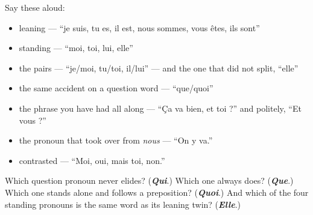 Say these aloud:

\begin{itemize}
\raggedright
  \item leaning — \textquotedblleft{}je suis, tu es, il est, nous sommes, vous êtes, ils sont\textquotedblright{}
  \item standing — \textquotedblleft{}moi, toi, lui, elle\textquotedblright{}
  \item the pairs — \textquotedblleft{}je/moi, tu/toi, il/lui\textquotedblright{} — and the one that did not split, \textquotedblleft{}elle\textquotedblright{}
  \item the same accident on a question word — \textquotedblleft{}que/quoi\textquotedblright{}
  \item the phrase you have had all along — \textquotedblleft{}Ça va bien, et toi ?\textquotedblright{} and politely, \textquotedblleft{}Et vous ?\textquotedblright{}
  \item the pronoun that took over from \emph{nous} — \textquotedblleft{}On y va.\textquotedblright{}
  \item contrasted — \textquotedblleft{}Moi, oui, mais toi, non.\textquotedblright{}
\end{itemize}

\begin{tcolorbox}[breakable,colback=teal!4,colframe=teal!35!black,title={Before you move on}]
Which question pronoun never elides? (\emph{\textbf{Qui}}.) Which one always does? (\emph{\textbf{Que}}.) Which one stands alone and follows a preposition? (\emph{\textbf{Quoi}}.) And which of the four standing pronouns is the same word as its leaning twin? (\emph{\textbf{Elle}}.)
\end{tcolorbox}
